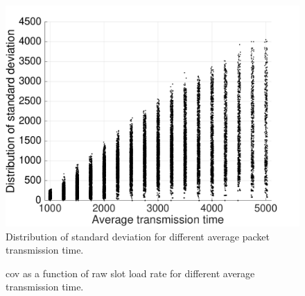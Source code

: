 \begin{figure}[t]
  \centering
  \includegraphics[width=0.85\columnwidth]{figures/std-txtime-distribution}
  \caption{Distribution of standard deviation for different average packet transmission time. \label{fig:tx-std-dist}}
\end{figure}



\begin{figure}[t]
    \centering
  \caption{\gls{cov} as a function of \gls{raw} slot load rate for different average transmission time.
  \label{fig:tx-diff-load}}
\end{figure}


